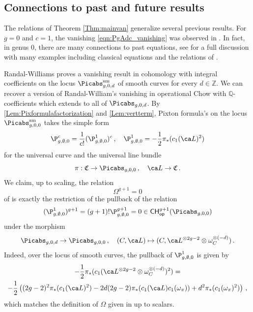 \subsection{Connections to past and future results}\label{pasfut}
The relations of Theorem \ref{Thm:mainvan}
 generalize several previous results.
For $g=0$ and $c=1$, the vanishing \eqref{eqn:PgAdc_vanishing}
was observed in \cite[Proposition 1.2]{deJongStarr}.
In fact, in genus $0$, there are many connections to past equations, see \cite[Section 4]{Bae}
for a full discussion with many examples including classical
equations and
the relations of \cite{LeePand}.


Randal-Williams \cite{RandalWilliams2012}  proves
a vanishing result in  cohomology with integral coefficients on the locus $\Picabs_{g,0,d}^\textup{sm}$ of smooth curves
for every $d \in \mathbb{Z}$.
We can recover a version of Randal-William's
vanishing in operational Chow  with $\mathbb{Q}$-coefficients which extends to all of $\Picabs_{g,0,d}$.  By \cref{Lem:Pixformulafactorization} and \cref{Lem:vertterm},  Pixton formula's on the locus $\Picabs_{g,0,0}^\textup{sm}$ takes the simple form
\[\P_{g,\emptyset,0}^c = \frac{1}{c!} (\P_{g,\emptyset,0}^1)^c\, ,\ \ \  \P_{g,\emptyset,0}^1 = - \frac{1}{2} \pi_* (c_1(\ca L)^2)\]
for the universal curve and the universal line bundle
$$\pi: \frak C \to \Picabs_{g,0,0}\, , \ \ \ \ca L \to \frak C\, .$$
We claim, up to scaling, the relation
$$\Omega^{g+1}=0$$ of
\cite[Theorem A]{RandalWilliams2012} is exactly the restriction of the pullback of the relation $$(\P_{g,\emptyset,0}^1)^{g+1} = (g+1)! \P_{g,\emptyset,0}^{g+1} = 0
\in {\mathsf{CH}}^{g+1}_{\mathsf{op}}(\Picabs_{g,0,0})$$
under the morphism
\[\Picabs_{g,0,d} \to \Picabs_{g,0,0}\, ,\ \ \ (C, \ca L) \mapsto (C, \ca L^{\otimes 2g-2} \otimes \omega_C^{\otimes (-d)})\, .\]
Indeed, over the locus of smooth curves, the pullback of $\P_{g,\emptyset,0}^1$ is given by
\begin{multline*}
- \frac{1}{2} \pi_* (c_1(\ca L^{\otimes 2g-2} \otimes \omega_C^{\otimes (-d)})^2)=\\ -\frac{1}{2} \left((2g-2)^2 \pi_*(c_1(\ca L)^2) - 2d(2g-2)\pi_*(c_1(\ca L ) c_1(\omega_\pi)) + d^2 \pi_*(c_1(\omega_\pi)^2) \right)\, ,\end{multline*}
which matches the definition of $\Omega$ given in \cite[Theorem A]{RandalWilliams2012}
up to scalars.

